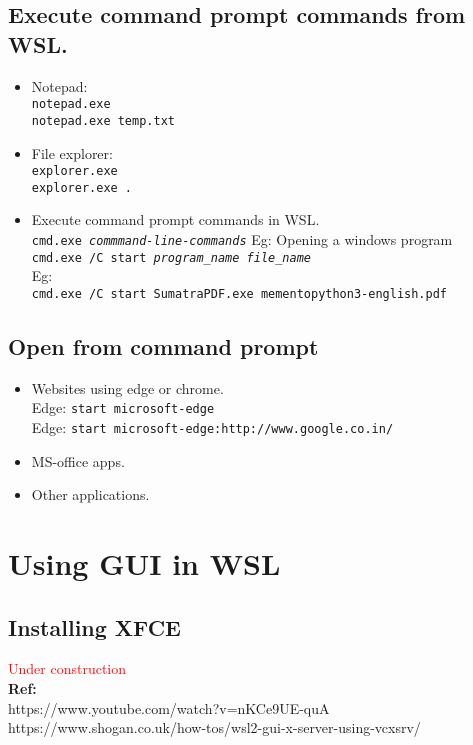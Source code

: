 \subsection{Execute command prompt commands from WSL.}
\begin{itemize}
	\item Notepad:\\
		\texttt{notepad.exe}\\
		\texttt{notepad.exe temp.txt}\\
	\item File explorer:\\
		\texttt{explorer.exe}\\
		\texttt{explorer.exe .}\\
	\item Execute command prompt commands in WSL.\\
		\texttt{cmd.exe \textit{commmand-line-commands}}
		Eg: Opening a windows program\\
		\texttt{cmd.exe /C start \textit{program\_name} \textit{file\_name}}\\
		Eg:\\
		\texttt{cmd.exe /C start SumatraPDF.exe mementopython3-english.pdf}
\end{itemize}

\subsection{Open from command prompt}
\begin{itemize}
	\item Websites using edge or chrome.\\
		Edge: \texttt{start microsoft-edge}\\
		Edge: \texttt{start microsoft-edge:http://www.google.co.in/}\\
	\item MS-office apps.\\
	\item Other applications.\\
\end{itemize}

\vfill \null
\columnbreak

\section{Using GUI in WSL}
\subsection{Installing XFCE}
\textcolor{red}{Under construction}\\
\textbf{Ref:}\\
https://www.youtube.com/watch?v=nKCe9UE-quA\\
https://www.shogan.co.uk/how-tos/wsl2-gui-x-server-using-vcxsrv/


